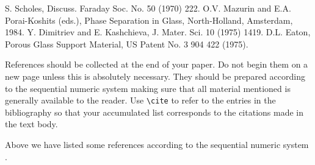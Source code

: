 \begin{thebibliography}{9}
 S. Scholes, Discuss. Faraday Soc. No. 50 (1970) 222.
 O.V. Mazurin and E.A. Porai-Koshits (eds.),
                 Phase Separation in Glass, North-Holland, Amsterdam, 1984.
 Y. Dimitriev and E. Kashchieva, 
                 J. Mater. Sci. 10 (1975) 1419.
 D.L. Eaton, Porous Glass Support Material,
                 US Patent No. 3 904 422 (1975).
\end{thebibliography}

References should be collected at the end of your paper. Do not begin
them on a new page unless this is absolutely necessary. They should be
prepared according to the sequential numeric system making sure that
all material mentioned is generally available to the reader. Use
\verb+\cite+ to refer to the entries in the bibliography so that your
accumulated list corresponds to the citations made in the text body. 

Above we have listed some references according to the
sequential numeric system \cite{Scho70,Mazu84,Dimi75,Eato75}.

